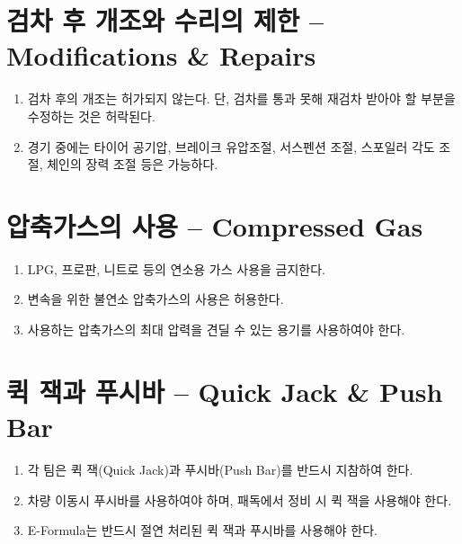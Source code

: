 \documentclass[final,a4paper,10pt]{report}
\begin{document}

\section{검차 후 개조와 수리의 제한 – Modifications \& Repairs}\label{rule:formula-technical.post-inspection-modifications}
\begin{enumerate}
  \item\label{rule:formula-technical.post-inspection-modifications.ban-except-reinspection-fixes} 검차 후의 개조는 허가되지 않는다. 단, 검차를 통과 못해 재검차 받아야 할 부분을 수정하는 것은 허락된다.
  \item\label{rule:formula-technical.post-inspection-modifications.permitted-race-adjustments} 경기 중에는 타이어 공기압, 브레이크 유압조절, 서스펜션 조절, 스포일러 각도 조절, 체인의 장력 조절 등은 가능하다.
\end{enumerate}

\section{압축가스의 사용 – Compressed Gas}\label{rule:formula-technical.compressed-gas}
\begin{enumerate}
  \item\label{rule:formula-technical.compressed-gas.no-combustible-gas} LPG, 프로판, 니트로 등의 연소용 가스 사용을 금지한다.
  \item\label{rule:formula-technical.compressed-gas.noncombustible-shift-gas} 변속을 위한 불연소 압축가스의 사용은 허용한다.
  \item\label{rule:formula-technical.compressed-gas.pressure-rated-container} 사용하는 압축가스의 최대 압력을 견딜 수 있는 용기를 사용하여야 한다.
\end{enumerate}

\section{퀵 잭과 푸시바 – Quick Jack \& Push Bar}\label{rule:formula-technical.quick-jack-push-bar}
\begin{enumerate}
  \item\label{rule:formula-technical.quick-jack-push-bar.mandatory-equipment} 각 팀은 퀵 잭(Quick Jack)과 푸시바(Push Bar)를 반드시 지참하여 한다.
  \item\label{rule:formula-technical.quick-jack-push-bar.transport-vs-service-use} 차량 이동시 푸시바를 사용하여야 하며, 패독에서 정비 시 퀵 잭을 사용해야 한다.
  \item\label{rule:formula-technical.quick-jack-push-bar.insulated-for-e-formula} E-Formula는 반드시 절연 처리된 퀵 잭과 푸시바를 사용해야 한다.
\end{enumerate}
\end{document}
